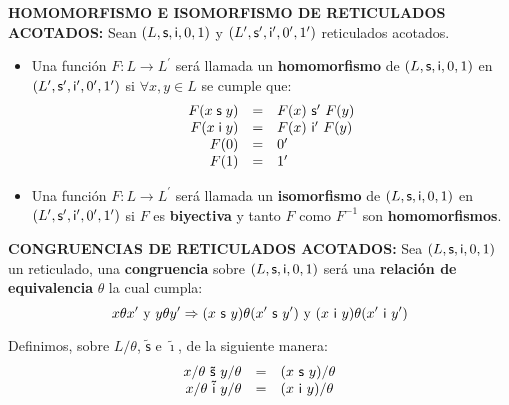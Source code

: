   \vspace{3mm}
  \PN \textbf{HOMOMORFISMO E ISOMORFISMO DE RETICULADOS ACOTADOS:} Sean $(L, \mathsf{s}, \mathsf{i}, 0, 1)$ y
  $(L^{\prime}, \mathsf{s}^{\prime}, \mathsf{i}^{\prime}, 0^{\prime}, 1^{\prime})$ reticulados acotados.
  \begin{itemize}
    \item Una función $F: L \rightarrow L^{\prime}$ será llamada un \textbf{homomorfismo} de $(L, \mathsf{s}, \mathsf{i}, 0, 1)$ en
      $(L^{\prime}, \mathsf{s}^{\prime}, \mathsf{i}^{\prime}, 0^{\prime}, 1^{\prime})$ si $\forall x, y \in L$ se cumple que:
      \[
        \begin{array}{rcl}
          F(x \mathsf{\;s\;} y) &=& F(x) \ \mathsf{s}^{\prime} \ F(y) \\
          F(x \mathsf{\;i\;} y) &=& F(x) \ \mathsf{i}^{\prime} \ F(y) \\
          F(0) &=& 0^{\prime} \\
          F(1) &=& 1^{\prime}
        \end{array}
      \]
    \item Una función $F: L \rightarrow L^{\prime}$ será llamada un \textbf{isomorfismo} de $(L, \mathsf{s}, \mathsf{i}, 0, 1)$ en
      $(L^{\prime}, \mathsf{s}^{\prime}, \mathsf{i}^{\prime}, 0^{\prime}, 1^{\prime})$ si $F$ es \textbf{biyectiva} y tanto $F$ como
      $F^{-1}$ son \textbf{homomorfismos}.
  \end{itemize}

  \vspace{3mm}
  \PN \textbf{CONGRUENCIAS DE RETICULADOS ACOTADOS:} Sea $(L, \mathsf{s}, \mathsf{i}, 0, 1)$ un reticulado, una \textbf{congruencia}
  sobre $(L, \mathsf{s}, \mathsf{i}, 0, 1)$ será una \textbf{relación de equivalencia} $\theta$ la cual cumpla:
  \[
    x \theta x^{\prime} \text{ y } y \theta y^{\prime} \Rightarrow (x \ \SU \ y) \theta (x^{\prime} \ \SU \ y^{\prime})
    \text{ y } (x \ \IN \ y) \theta (x^{\prime} \ \IN \ y^{\prime})
  \]

  \PN Definimos, sobre $L/\theta$, $\mathsf{\tilde{s}}$ e $\mathsf{\tilde{\imath}}$, de la siguiente manera:
  \[
    \begin{array}{rcl}
      x/\theta \ \mathsf{\tilde{s}} \ y/\theta &=& (x \ \SU \ y)/\theta \\
      x/\theta \ \mathsf{\tilde{i}} \ y/\theta &=& (x \ \IN \ y)/\theta
    \end{array}
  \]
